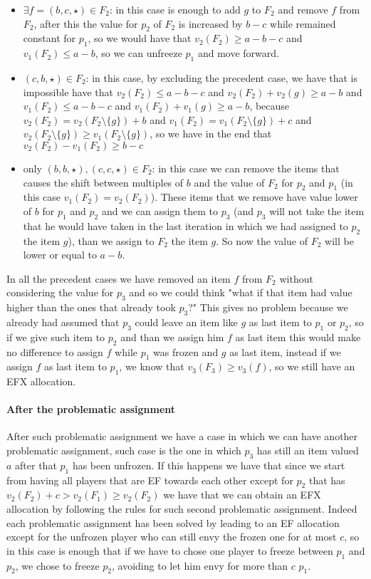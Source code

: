 \documentclass{article}
\begin{document}
\begin{itemize}
    \item $\exists f=(b,c,\star)\in F_2$: in this case is enough to add $g$ to $F_2$ and remove $f$ from $F_2$, after this the value for $p_2$ of $F_2$ is increased by $b-c$ while remained constant for $p_1$, so we would have that $v_2(F_2)\ge a-b-c$ and $v_1(F_2) \le a-b$, so we can unfreeze $p_1$ and move forward. 
    \item $(c,b,\star)\in F_2$: in this case, by excluding the precedent case, we have that is impossible have that $v_2(F_2) \le a-b-c$ and $v_2(F_2) +v_2(g)\ge a-b$ and $v_1(F_2) \le a-b-c$ and $v_1(F_2) +v_1(g)\ge a-b$, because $v_2(F_2) = v_2(F_2\setminus \{g\}) + b$ and $v_1(F_2) = v_1(F_2\setminus \{g\}) + c$ and $v_2(F_2\setminus \{g\}) \ge v_1(F_2\setminus \{g\})$, so we have in the end that $v_2(F_2) - v_1(F_2) \ge b-c$
    \item only $(b,b,\star), (c,c,\star)\in F_2$: in this case we can remove the items that causes the shift between multiples of $b$ and the value of $F_2$ for $p_2$ and $p_1$ (in this case $v_1(F_2) = v_2(F_2)$). These items that we remove have value lower of $b$ for $p_1$ and $p_2$ and we can assign them to $p_3$ (and $p_3$ will not take the item that he would have taken in the last iteration in which we had assigned to $p_2$ the item $g$), than we assign to $F_2$ the item $g$. So now the value of $F_2$ will be lower or equal to $a-b$. 
\end{itemize}
In all the precedent cases we have removed an item $f$ from $F_2$ without considering the value for $p_3$ and so we could think "what if that item had value higher than the ones that already took $p_3$?" This gives no problem because we already had assumed that $p_3$ could leave an item like $g$ as last item to $p_1$ or $p_2$, so if we give such item to $p_2$ and than we assign him $f$ as last item this would make no difference to assign $f$ while $p_1$ was frozen and $g$ as last item, instead if we assign $f$ as last item to $p_1$, we know that $v_3(F_3)\ge v_3(f)$, so we still have an EFX allocation. 

\paragraph{After the problematic assignment} After such problematic assignment we have a case in which we can have another problematic assignment, such case is the one in which $p_3$ has still an item valued $a$ after that $p_1$ has been unfrozen. If this happens we have that since we start from having all players that are EF towards each other except for $p_2$ that has $v_2(F_2) + c > v_2(F_1) \ge v_2(F_2)$ we have that we can obtain an EFX allocation by following the rules for such second problematic assignment. Indeed each problematic assignment has been solved by leading to an EF allocation except for the unfrozen player who can still envy the frozen one for at most $c$, so in this case is enough that if we have to chose one player to freeze between $p_1$ and $p_2$, we chose to freeze $p_2$, avoiding to let him envy for more than $c$ $p_1$.
\end{document}
